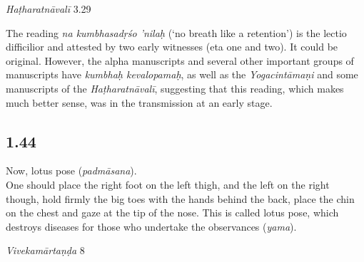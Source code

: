\begin{ekdosis}
\begin{testimonia}[hp01_043]
\begin{versinnote}
\end{versinnote}

\emph{Haṭharatnāvalī} 3.29

\begin{versinnote}
\tl{\var{kumbhaḥ kevalopamaḥ ] kumbhasadṛśo 'nilaḥ N,n1,n2,n3,J}\\!}
\end{versinnote}

\end{testimonia}

\begin{philcomm}[hp01_043]
The reading \emph{na kumbhasadṛśo 'nilaḥ} (`no breath like a retention') is the lectio difficilior and attested by two early witnesses (eta one and two). It could be original. However, the alpha manuscripts and several other important groups of manuscripts have \emph{kumbhaḥ kevalopamaḥ}, as well as the \emph{Yogacintāmaṇi} and some manuscripts of the \emph{Haṭharatnāvalī}, suggesting that this reading, which makes much better sense, was in the transmission at an early stage.    
%
\end{philcomm}

\subsection*{1.44}
\begin{translation}[hp01_044]
Now, lotus pose (\emph{padmāsana}).\\
One should place the right foot on the left thigh, and the left on the right though, hold firmly the big toes with the hands behind the back, place the chin on the chest and gaze at the tip of the nose. This is called lotus pose, which destroys diseases for those who undertake the observances (\emph{yama}).
\end{translation}

\begin{sources}[hp01_044]
\emph{Vivekamārtaṇḍa} 8

\begin{versinnote}
\end{versinnote}


\end{sources}
\end{ekdosis}

